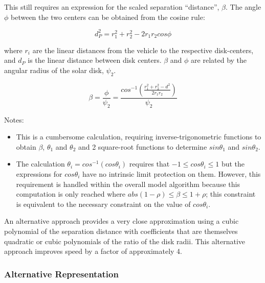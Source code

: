    This still requires an expression for the scaled separation ``distance'',
   $\beta$.  The angle $\phi$  between the two centers can be obtained
   from the cosine rule:

   \begin{equation*}
      d_P^2 = r_1^2 + r_2^2 - 2 r_1 r_2 cos \phi
   \end{equation*}

   where $r_i$ are the linear distances from the vehicle to the respective
   disk-centers, and $d_P$ is the linear distance between disk centers.
   $\beta$ and $\phi$ are related by the angular radius of the solar disk,
   $\psi_2$.

   \begin{equation*}
      \beta = \frac{\phi}{\psi_2} =
      \frac{cos^{-1} \left( \frac{r_1^2 + r_2^2 - d^2}{2 r_1 r_2} \right)}
           {\psi_2}
   \end{equation*}





   Notes:
   \begin{itemize}
   \item This is a cumbersome calculation, requiring
   inverse-trigonometric functions to obtain $\beta$, $\theta_1$ and
   $\theta_2$ and
   2 square-root functions to determine $sin \theta_1$ and $sin \theta_2$.
   \item The calculation $\theta_i = cos^{-1} (cos \theta_i)$ requires that $-1
   \leqslant cos \theta_i \leqslant 1$ but the expressions for
   $cos \theta_i$ have no intrinsic limit protection on them.  However,
   this requirement is handled
   within the overall model algorithm because this computation is only
   reached where $abs(1-\rho) \leqslant \beta \leqslant 1+\rho$; this constraint
   is equivalent to the necessary constraint on the value of $cos \theta_i$.
   \end{itemize}

   An alternative approach provides a very close approximation using a cubic
   polynomial of the separation distance with coefficients that are themselves
   quadratic or cubic polynomials of the ratio of the disk radii.  This
   alternative approach improves speed by a factor of approximately 4.

   \subsubsection{Alternative Representation}

